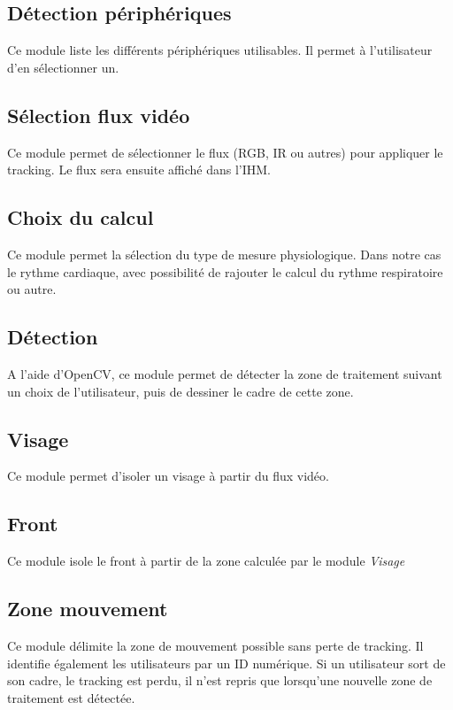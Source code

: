 \documentclass[12pt,a4paper]{article}
\begin{document}
\subsection*{Détection périphériques}
Ce module liste les différents périphériques utilisables. Il permet à l'utilisateur d'en sélectionner un.

\subsection*{Sélection flux vidéo}

Ce module permet de sélectionner le flux (RGB, IR ou autres) pour appliquer le tracking. Le flux sera ensuite affiché dans l'IHM.

\subsection*{Choix du calcul}
Ce module permet la sélection du type de mesure physiologique. Dans notre cas le rythme cardiaque, avec possibilité de rajouter le calcul du rythme respiratoire ou autre.

\subsection*{Détection}
A l'aide d'OpenCV, ce module permet de détecter la zone de traitement suivant un choix de l'utilisateur, puis de dessiner le cadre de cette zone.

\subsection*{Visage}
Ce module permet d'isoler un visage à partir du flux vidéo.

\subsection*{Front}
Ce module isole le front à partir de la zone calculée par le module \textit{Visage}

\subsection*{Zone mouvement}

Ce module délimite la zone de mouvement possible sans perte de tracking. Il identifie également les utilisateurs par un ID numérique. Si un utilisateur sort de son cadre, le tracking est perdu, il n'est repris que lorsqu'une nouvelle zone de traitement est détectée.
\end{document}
